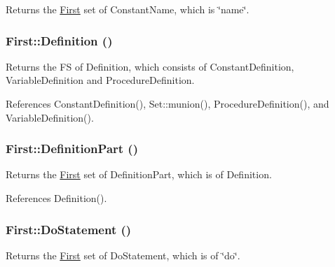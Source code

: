 Returns the \hyperlink{classFirst}{First} set of ConstantName, which is \char`\"{}name\char`\"{}. 

\hypertarget{classFirst_a68b6b0e9e971cbd2acf56a625ebe0599}{
\subsubsection[{Definition}]{ First::Definition ()}}
\label{classFirst_a68b6b0e9e971cbd2acf56a625ebe0599}


Returns the FS of Definition, which consists of ConstantDefinition, VariableDefinition and ProcedureDefinition. 



References ConstantDefinition(), Set::munion(), ProcedureDefinition(), and VariableDefinition().

\hypertarget{classFirst_aedd571350accc9639500cbded4a5b183}{
\subsubsection[{DefinitionPart}]{ First::DefinitionPart ()}}
\label{classFirst_aedd571350accc9639500cbded4a5b183}


Returns the \hyperlink{classFirst}{First} set of DefinitionPart, which is of Definition. 



References Definition().

\hypertarget{classFirst_a163746bc8795e5f57ccd145a4f462a73}{
\subsubsection[{DoStatement}]{ First::DoStatement ()}}
\label{classFirst_a163746bc8795e5f57ccd145a4f462a73}


Returns the \hyperlink{classFirst}{First} set of DoStatement, which is of \char`\"{}do\char`\"{}. 

